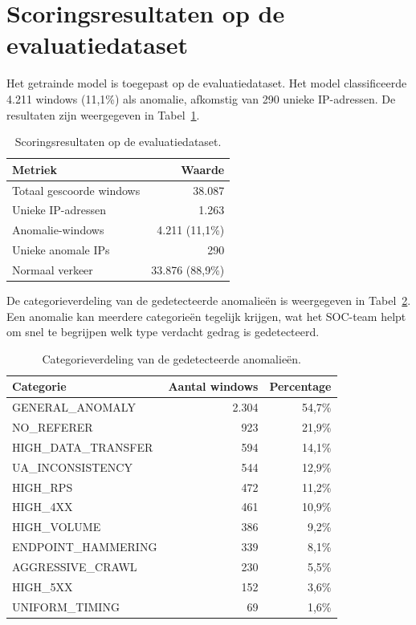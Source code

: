  
\section{Scoringsresultaten op de evaluatiedataset}
\label{sec:scoringsresultaten}
 
Het getrainde model is toegepast op de evaluatiedataset. Het model classificeerde 4.211 windows (11,1\%) als anomalie, afkomstig van 290 unieke IP-adressen. De resultaten zijn weergegeven in Tabel~\ref{tab:scoringsresultaten}.
 
\begin{table}[h]
\centering
\caption{Scoringsresultaten op de evaluatiedataset.}
\label{tab:scoringsresultaten}
\begin{tabular}{l r}
\hline
\textbf{Metriek} & \textbf{Waarde} \\
\hline
Totaal gescoorde windows & 38.087 \\
Unieke IP-adressen & 1.263 \\
Anomalie-windows & 4.211 (11,1\%) \\
Unieke anomale IPs & 290 \\
Normaal verkeer & 33.876 (88,9\%) \\
\hline
\end{tabular}
\end{table}
 
De categorieverdeling van de gedetecteerde anomalieën is weergegeven in Tabel~\ref{tab:categorieverdeling}. Een anomalie kan meerdere categorieën tegelijk krijgen, wat het SOC-team helpt om snel te begrijpen welk type verdacht gedrag is gedetecteerd.
 
\begin{table}[h]
\centering
\caption{Categorieverdeling van de gedetecteerde anomalieën.}
\label{tab:categorieverdeling}
\begin{tabular}{l r r}
\hline
\textbf{Categorie} & \textbf{Aantal windows} & \textbf{Percentage} \\
\hline
GENERAL\_ANOMALY & 2.304 & 54,7\% \\
NO\_REFERER & 923 & 21,9\% \\
HIGH\_DATA\_TRANSFER & 594 & 14,1\% \\
UA\_INCONSISTENCY & 544 & 12,9\% \\
HIGH\_RPS & 472 & 11,2\% \\
HIGH\_4XX & 461 & 10,9\% \\
HIGH\_VOLUME & 386 & 9,2\% \\
ENDPOINT\_HAMMERING & 339 & 8,1\% \\
AGGRESSIVE\_CRAWL & 230 & 5,5\% \\
HIGH\_5XX & 152 & 3,6\% \\
UNIFORM\_TIMING & 69 & 1,6\% \\
\hline
\end{tabular}
\end{table}
 
